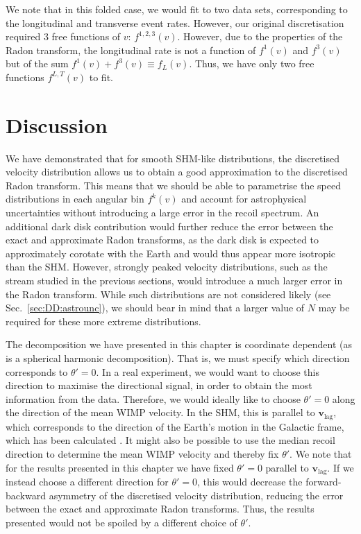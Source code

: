 We note that in this folded case, we would fit to two data sets, corresponding to the longitudinal and transverse event rates. However, our original discretisation required 3 free functions of $v$: $f^{1,2,3}(v)$. However, due to the properties of the Radon transform, the longitudinal rate is not a function of $f^1(v)$ and $f^3(v)$ but of the sum $f^1(v) + f^3(v) \equiv f_L(v)$. Thus, we have only two free functions $f^{L,T}(v)$ to fit.


\section{Discussion}

We have demonstrated that for smooth SHM-like distributions, the discretised velocity distribution allows us to obtain a good approximation to the discretised Radon transform. This means that we should be able to parametrise the speed distributions in each angular bin $f^k(v)$ and account for astrophysical uncertainties without introducing a large error in the recoil spectrum.
An additional dark disk contribution would further reduce the error between the exact and approximate Radon transforms, as the dark disk is expected to approximately corotate with the Earth and would thus appear more isotropic than the SHM. However, strongly peaked velocity distributions, such as the stream studied in the previous sections, would introduce a much larger error in the Radon transform. While such distributions are not considered likely (see Sec.~\ref{sec:DD:astrounc}), we should bear in mind that a larger value of $N$ may be required for these more extreme distributions.

The decomposition we have presented in this chapter is coordinate dependent (as is a spherical harmonic decomposition). That is, we must specify which direction corresponds to $\theta' = 0$. In a real experiment, we would want to choose this direction to maximise the directional signal, in order to obtain the most information from the data. Therefore, we would ideally like to choose $\theta' = 0$ along the direction of the mean WIMP velocity. In the SHM, this is parallel to $\mathbf{v}_\textrm{lag}$, which corresponds to the direction of the Earth's motion in the Galactic frame, which has been calculated \cite{McCabe:2014}. It might also be possible to use the median recoil direction to determine the mean WIMP velocity and thereby fix $\theta'$. We note that for the results presented in this chapter we have fixed $\theta' = 0$ parallel to $\mathbf{v}_\textrm{lag}$. If we instead choose a different direction for $\theta'= 0$, this would decrease the forward-backward asymmetry of the discretised velocity distribution, reducing the error between the exact and approximate Radon transforms. Thus, the results presented would not be spoiled by a different choice of $\theta'$.

